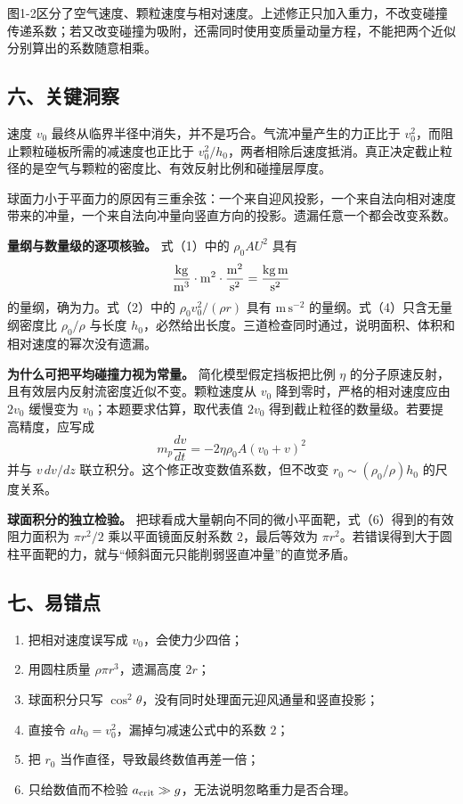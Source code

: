 \documentclass[12pt,a4paper,UTF8]{ctexart}
\newcommand{\tightlist}{\setlength{\itemsep}{0pt}\setlength{\parskip}{0pt}}
\begin{document}
图1-2区分了空气速度、颗粒速度与相对速度。上述修正只加入重力，不改变碰撞传递系数；若又改变碰撞为吸附，还需同时使用变质量动量方程，不能把两个近似分别算出的系数随意相乘。

\subsection{六、关键洞察}\label{ux516dux5173ux952eux6d1eux5bdf}

速度 \(v_0\) 最终从临界半径中消失，并不是巧合。气流冲量产生的力正比于
\(v_0^2\)，而阻止颗粒碰板所需的减速度也正比于
\(v_0^2/h_0\)，两者相除后速度抵消。真正决定截止粒径的是空气与颗粒的密度比、有效反射比例和碰撞层厚度。

球面力小于平面力的原因有三重余弦：一个来自迎风投影，一个来自法向相对速度带来的冲量，一个来自法向冲量向竖直方向的投影。遗漏任意一个都会改变系数。

\textbf{量纲与数量级的逐项核验。} 式（1）中的 \(\rho_0A U^2\) 具有 \[
\frac{\rm kg}{\rm m^3}\cdot{\rm m^2}\cdot
\frac{{\rm m}^2}{{\rm s}^2}
=\frac{{\rm kg\,m}}{{\rm s}^2}
\] 的量纲，确为力。式（2）中的 \(\rho_0v_0^2/(\rho r)\) 具有
\(\mathrm{m\,s^{-2}}\) 的量纲。式（4）只含无量纲密度比 \(\rho_0/\rho\)
与长度
\(h_0\)，必然给出长度。三道检查同时通过，说明面积、体积和相对速度的幂次没有遗漏。

\textbf{为什么可把平均碰撞力视为常量。} 简化模型假定挡板把比例 \(\eta\)
的分子原速反射，且有效层内反射流密度近似不变。颗粒速度从 \(v_0\)
降到零时，严格的相对速度应由 \(2v_0\) 缓慢变为
\(v_0\)；本题要求估算，取代表值 \(2v_0\)
得到截止粒径的数量级。若要提高精度，应写成 \[
m_p\frac{dv}{dt}
=-2\eta\rho_0A(v_0+v)^2
\] 并与 \(v\,dv/dz\) 联立积分。这个修正改变数值系数，但不改变
\(r_0\sim(\rho_0/\rho)h_0\) 的尺度关系。

\textbf{球面积分的独立检验。}
把球看成大量朝向不同的微小平面靶，式（6）得到的有效阻力面积为
\(\pi r^2/2\) 乘以平面镜面反射系数 \(2\)，最后等效为
\(\pi r^2\)。若错误得到大于圆柱平面靶的力，就与``倾斜面元只能削弱竖直冲量''的直觉矛盾。

\subsection{七、易错点}\label{ux4e03ux6613ux9519ux70b9}

\begin{enumerate}
\def\labelenumi{\arabic{enumi}.}
\tightlist
\item
  把相对速度误写成 \(v_0\)，会使力少四倍；
\item
  用圆柱质量 \(\rho\pi r^3\)，遗漏高度 \(2r\)；
\item
  球面积分只写 \(\cos^2\theta\)，没有同时处理面元迎风通量和竖直投影；
\item
  直接令 \(a h_0=v_0^2\)，漏掉匀减速公式中的系数 \(2\)；
\item
  把 \(r_0\) 当作直径，导致最终数值再差一倍；
\item
  只给数值而不检验 \(a_{\rm crit}\gg g\)，无法说明忽略重力是否合理。
\end{enumerate}
\end{document}
